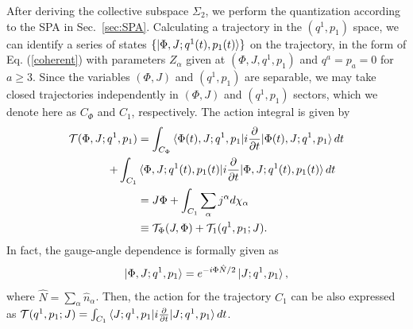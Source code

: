 \documentclass[%
superscriptaddress,
showpacs,
nofootinbib,
amsmath,amssymb,
aps,
prc,
twocolumn,
floatfix ]%
{revtex4-1}
\begin{document}
After deriving the collective subspace $\Sigma_2$, 
we perform the quantization according to the SPA in Sec.~\ref{sec:SPA}.
Calculating a trajectory in the $(q^1,p_1)$ space,
we can identify a series of states $\{\ket{\Phi,J;q^1(t),p_1(t)}\}$
on the trajectory,
in the form of Eq. (\ref{coherent})
with parameters $Z_\alpha$ given at $(\Phi,J,q^1,p_1)$ and $q^a=p_a=0$ for
$a\geq 3$.
Since the variables $(\Phi,J)$ and $(q^1,p_1)$ are separable,
we may take closed trajectories independently in $(\Phi,J)$ and $(q^1,p_1)$
sectors, which we denote here as $C_\Phi$ and $C_1$, respectively.
The action integral is given by
\begin{align}
\mathcal{T}(\Phi,J;q^1,p_1)
&= \int_{C_\Phi} \braket{\Phi(t),J;q^1,p_1|i\frac{\partial}{\partial t}|\Phi(t),J;q^1,p_1} dt \nonumber \\
+ \int_{C_1} &\braket{\Phi,J;q^1(t),p_1(t)|i\frac{\partial}{\partial t}|\Phi,J;q^1(t),p_1(t)} dt
 \nonumber \\
	&=J\Phi + \int_{C_1} \sum_\alpha j^\alpha d\chi_\alpha
	\nonumber \\
	&\equiv \mathcal{T}_\Phi(J,\Phi) +\mathcal{T}_1(q^1,p_1;J) .
\end{align}
In fact, the gauge-angle dependence is formally given as
\begin{equation}
  \ket{\Phi,J;q^1,p_1} = e^{-i\Phi \hat{N}/2} \ket{J;q^1,p_1},
\end{equation}
where $\hat{N}=\sum_\alpha \hat{n}_\alpha$.
Then, the action for the trajectory $C_1$ can be also expressed as
$\mathcal{T}(q^1,p_1;J)=
 \int_{C_1} \braket{J;q^1,p_1|i\frac{\partial}{\partial t}|J;q^1,p_1} dt$.
\end{document}
